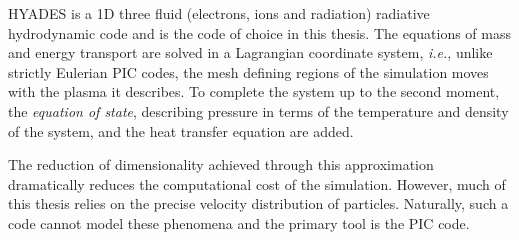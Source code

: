HYADES is a 1D three fluid (electrons, ions and radiation) radiative hydrodynamic code \cite{larsenHYADESPlasmaHydrodynamics1994} and is the code of choice in this thesis. The equations of mass and energy transport are solved in a Lagrangian coordinate system, \textit{i.e.}, unlike strictly Eulerian PIC codes, the mesh defining regions of the simulation moves with the plasma it describes. To complete the system up to the second moment, the \textit{equation of state}, describing pressure in terms of the temperature and density of the system, and the heat transfer equation are added. 


The reduction of dimensionality achieved through this approximation dramatically reduces the computational cost of the simulation. However, much of this thesis relies on the precise velocity distribution of particles. Naturally, such a code cannot model these phenomena and the primary tool is the PIC code.


